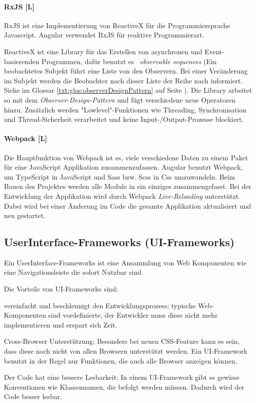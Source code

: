 \paragraph{RxJS [L]}
RxJS ist eine Implementierung von ReactiveX für die Programmiersprache Javascript. Angular verwendet RxJS für reaktive Programmierart.

ReactiveX ist eine Library für das Erstellen von asynchronen und Event-basierenden Programmen, dafür benutzt es  \emph{observable sequences} (Ein beobachtetes Subjekt führt eine Liste von den Observern. Bei einer Veränderung im Subjekt werden die Beobachter nach dieser Liste der Reihe nach informiert. Siehe im Glossar \ref{txt:glos:observerDesignPattern} auf Seite \pageref{txt:glos:observerDesignPattern}).
Die Library arbeitet so mit dem \emph{Observer-Design-Pattern} und fügt verschiedene neue Operatoren hinzu. Zusätzlich werden "Lowlevel"-Funktionen wie Threading, Synchronisation und Thread-Sicherheit verarbeitet und keine Input-/Output-Prozesse blockiert. \cite{ReactiveXIntro}

\paragraph{Webpack [L]}
Die Hauptfunktion von Webpack ist es, viele verschiedene Daten zu einem Paket für eine JavaScript Applikation zusammenzufassen.
Angular benutzt Webpack, um TypeScript in JavaScript und Sass bzw. Scss in Css umzuwandeln. Beim Bauen des Projektes werden alle Module in ein einziges zusammengefasst. Bei der Entwicklung der Applikation wird durch Webpack \emph{Live-Reloading} unterstützt. Dabei wird bei einer Änderung im Code die gesamte Applikation aktualisiert und neu gestartet.

\subsection*{UserInterface-Frameworks (UI-Frameworks)}
Ein UserInterface-Frameworks ist eine Ansammlung von Web Komponenten wie eine Navigationsleiste die sofort Nutzbar sind.  


Die Vorteile von UI-Frameworks sind:\cite{CssFrameworkExplaination, BestCSSFrameworksin2022}
\begin{compactitem}
    \item vereinfacht und beschleunigt den Entwicklungsprozess;
    typische Web-Komponenten sind vordefinierte, der Entwickler muss diese nicht mehr implementieren und erspart sich Zeit.
    \item Cross-Browser Unterstützung;
    Besonders bei neuen CSS-Feature kann es sein, dass diese noch nicht von allen Browsern unterstützt werden. Ein UI-Framework benutzt in der Regel nur Funktionen, die auch alle Browser anzeigen können.
    \item Der Code hat eine bessere Lesbarkeit;
    In einem UI-Framework gibt es gewisse Konventionen wie Klassennamen, die befolgt werden müssen. Dadurch wird der Code besser lesbar.
\end{compactitem}


